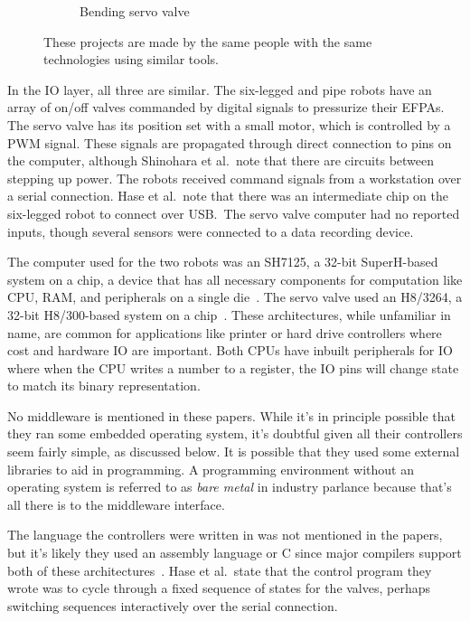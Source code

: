 \documentclass[english,12pt,a4paper,pdftex,eng,utf8]{aaltothesis}
\begin{document}
\begin{figure}[h]
\begin{subfigure}[t]{0.5\textwidth}
    \caption{Bending servo valve~\cite{Kobayashi2020}}\label{sfig:bending_servo_valve}
  \end{subfigure}
  \caption{These projects are made by the same people with the same technologies using similar tools.}\label{fig:soft_pneumatic_actuators_demo}
\end{figure}

In the IO layer, all three are similar. The six-legged and pipe robots have an array of on/off valves commanded by digital signals to pressurize their EFPAs. The servo valve has its position set with a small motor, which is controlled by a PWM signal. These signals are propagated through direct connection to pins on the computer, although Shinohara et al.\ note that there are circuits between stepping up power. The robots received command signals from a workstation over a serial connection. Hase et al.\ note that there was an intermediate chip on the six-legged robot to connect over USB.\ The servo valve computer had no reported inputs, though several sensors were connected to a data recording device.

The computer used for the two robots was an SH7125, a 32-bit SuperH-based system on a chip, a device that has all necessary components for computation like CPU, RAM, and peripherals on a single die~\cite{SH7125}. The servo valve used an H8/3264, a 32-bit H8/300-based system on a chip~\cite{H83264}. These architectures, while unfamiliar in name, are common for applications like printer or hard drive controllers where cost and hardware IO are important. Both CPUs have inbuilt peripherals for IO where when the CPU writes a number to a register, the IO pins will change state to match its binary representation.

No middleware is mentioned in these papers. While it's in principle possible that they ran some embedded operating system, it's doubtful given all their controllers seem fairly simple, as discussed below. It is possible that they used some external libraries to aid in programming. A programming environment without an operating system is referred to as \textit{bare metal} in industry parlance because that's all there is to the middleware interface.

The language the controllers were written in was not mentioned in the papers, but it's likely they used an assembly language or C since major compilers support both of these architectures~\cite{GccSupportedArchitectures}. Hase et al.\ state that the control program they wrote was to cycle through a fixed sequence of states for the valves, perhaps switching sequences interactively over the serial connection.
\end{document}
